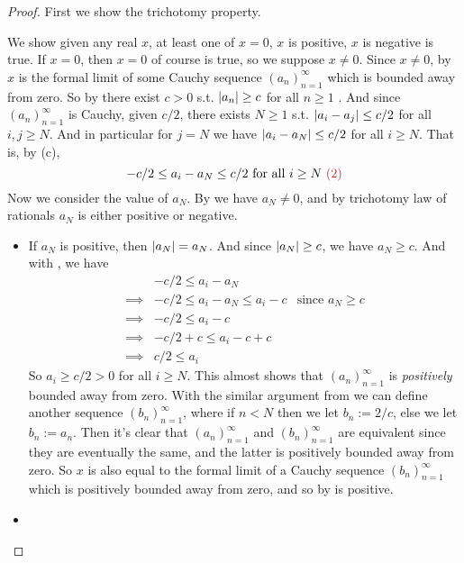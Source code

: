 \begin{proof}
First we show the trichotomy property.

We show given any real \(x\), at least one of \(x = 0\), \(x\) is positive, \(x\) is negative is true.
If \(x = 0\), then \(x = 0\) of course is true, so we suppose \(x \neq 0\).
Since \(x \neq 0\), by  \(x\) is the formal limit of some Cauchy sequence \((a_n)_{n = 1}^{\infty}\) which is bounded away from zero.
So by  there exist \(c > 0\) s.t. \(\lvert a_n\rvert \ge c\) for all \(n \ge 1\) .
And since \((a_n)_{n = 1}^{\infty}\) is Cauchy, given \(c/2\), there exists \(N \ge 1\) s.t. \(\lvert a_i - a_j\rvert \le c/2\) for all \(i, j \ge N\).
And in particular for \(j = N\) we have \(\lvert a_i - a_N\rvert \le c/2\) for all \(i \ge N\).
That is, by (c),
\[
    -c/2 \le a_i - a_N \le c/2 \text{\ for all\ } i \ge N \MAROON{\ (2)}
\]
Now we consider the value of \(a_N\).
By  we have \(a_N \neq 0\), and by trichotomy law of rationals \(a_N\) is either positive or negative.
\begin{itemize}
    \item
        If \(a_N\) is positive, then \(\lvert a_N\rvert = a_N\).
        And since \(\lvert a_N\rvert \ge c\), we have \(a_N \ge c\).
        And with , we have
        \begin{align*}
                     & -c/2 \le a_i - a_N \\
            \implies & -c/2 \le a_i - a_N \le a_i - c & \text{since \(a_N \ge c\)} \\
            \implies & -c/2 \le a_i - c \\
            \implies & -c/2 + c \le a_i - c + c \\
            \implies & c/2 \le a_i
        \end{align*}
        So \(a_i \ge c/2 > 0\) for all \(i \ge N\).
        This almost shows that \((a_n)_{n = 1}^{\infty}\) is \emph{positively} bounded away from zero.
        With the similar argument from  we can define another sequence \((b_n)_{n = 1}^{\infty}\), where if \(n < N\) then we let \(b_n := 2/c\), else we let \(b_n := a_n\).
        Then it's clear that \((a_n)_{n = 1}^{\infty}\) and \((b_n)_{n = 1}^{\infty}\) are equivalent since they are eventually the same, and the latter is positively bounded away from zero.
        So \(x\) is also equal to the formal limit of a Cauchy sequence \((b_n)_{n = 1}^{\infty}\) which is positively bounded away from zero, and so by  is positive.
    \item

\end{itemize}
\end{proof}
